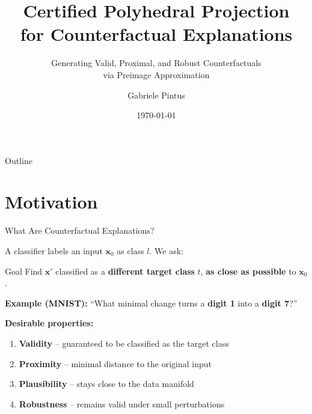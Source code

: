 \documentclass[aspectratio=169, 11pt]{beamer}
\title[CPP Counterfactuals]{%
  Certified Polyhedral Projection\\[4pt]
  for Counterfactual Explanations}
\subtitle{Generating Valid, Proximal, and Robust Counterfactuals\\via Preimage Approximation}
\author{Gabriele Pintus}
\date{\today}
\newcommand{\vx}{\mathbf{x}}
\begin{document}
\begin{frame}
  \titlepage
\end{frame}

\begin{frame}{Outline}
  \tableofcontents
\end{frame}

\section{Motivation}

\begin{frame}{What Are Counterfactual Explanations?}

A classifier labels an input $\vx_0$ as class $l$. We ask:

\begin{block}{Goal}
  Find $\vx'$ classified as a \textbf{different target class} $t$, \textbf{as close as possible} to $\vx_0$.
\end{block}

\bigskip

\textbf{Example (MNIST):} \enquote{What minimal change turns a \textbf{digit 1} into a \textbf{digit 7}?}

\bigskip

\textbf{Desirable properties:}
\begin{enumerate}
  \item \textbf{Validity} -- guaranteed to be classified as the target class
  \item \textbf{Proximity} -- minimal distance to the original input
  \item \textbf{Plausibility} -- stays close to the data manifold
  \item \textbf{Robustness} -- remains valid under small perturbations
\end{enumerate}

\end{frame}
\end{document}
